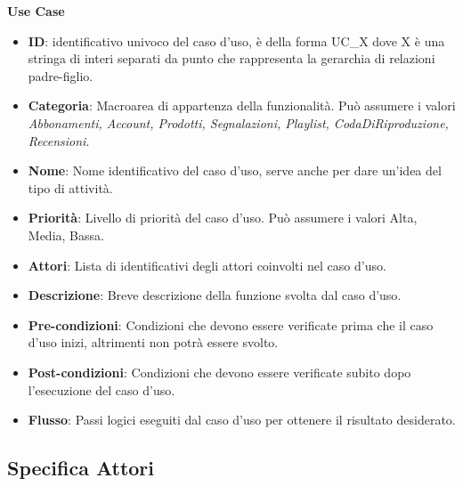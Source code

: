 \noindent \large{\textbf{Use Case}} \\
\begin{itemize}[]
	\item \textbf{ID}: identificativo univoco del caso d'uso, è della forma UC\_X dove X è una stringa di interi separati da punto che rappresenta la gerarchia di relazioni padre-figlio.
	\item \textbf{Categoria}: Macroarea di appartenza della funzionalità. Può assumere i valori \emph{Abbonamenti, Account, Prodotti, Segnalazioni, Playlist, CodaDiRiproduzione, Recensioni}.
	\item \textbf{Nome}: Nome identificativo del caso d'uso, serve anche per dare un'idea del tipo di attività.
	\item \textbf{Priorità}: Livello di priorità del caso d'uso. Può assumere i valori {Alta, Media, Bassa}. 
	\item \textbf{Attori}: Lista di identificativi degli attori coinvolti nel caso d'uso.
	\item \textbf{Descrizione}: Breve descrizione della funzione svolta dal caso d'uso.
	\item \textbf{Pre-condizioni}: Condizioni che devono essere verificate prima che il caso d'uso inizi, altrimenti non potrà essere svolto.
	\item \textbf{Post-condizioni}: Condizioni che devono essere verificate subito dopo l'esecuzione del caso d'uso.
	\item \textbf{Flusso}: Passi logici eseguiti dal caso d'uso per ottenere il risultato desiderato.

\end{itemize}


\subsection{Specifica Attori}

